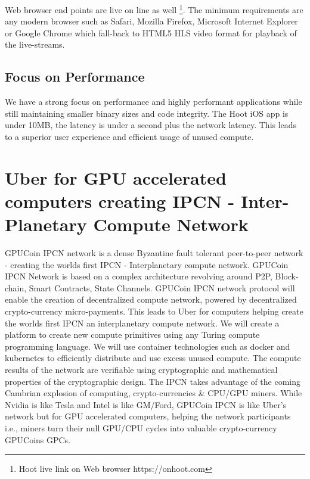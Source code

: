 \documentclass{article}
\begin{document}
Web browser end points are live on line as well
\footnote{Hoot live link on Web browser https://onhoot.com}. The minimum requirements are any modern
browser such as Safari, Mozilla Firefox, Microsoft Internet Explorer or Google Chrome which fall-back to HTML5 HLS video format for playback
of the live-streams.

\subsection{Focus on Performance}
We have a strong focus on performance and highly performant applications while still maintaining smaller binary sizes and code integrity. The Hoot iOS app is under 10MB, the latency is under a second plus the network latency. This leads to a superior user experience and efficient usage of unused compute.

\section{Uber for GPU accelerated computers creating IPCN - Inter-Planetary Compute Network}
GPUCoin IPCN network is a dense Byzantine fault tolerant peer-to-peer network - creating the worlds first IPCN - Interplanetary compute network. GPUCoin IPCN Network is based on a complex architecture revolving around P2P, Block-chain, Smart Contracts, State Channels. GPUCoin IPCN network protocol will enable the creation of decentralized compute network, powered by decentralized crypto-currency micro-payments. This leads to Uber for computers helping create the worlds first IPCN an interplanetary compute network. We will create a platform to create new compute primitives using any Turing compute programming language. We will use container technologies such as docker and kubernetes to efficiently distribute and use excess unused compute. The compute results of the network are verifiable using cryptographic and mathematical properties of the cryptographic design. The IPCN takes advantage of the coming Cambrian explosion of computing, crypto-currencies \& CPU/GPU miners. While Nvidia is like Tesla and Intel is like GM/Ford, GPUCoin IPCN is like Uber's network but for GPU accelerated computers, helping the network participants i.e., miners turn their null GPU/CPU cycles into valuable crypto-currency GPUCoins GPCs.
\end{document}
